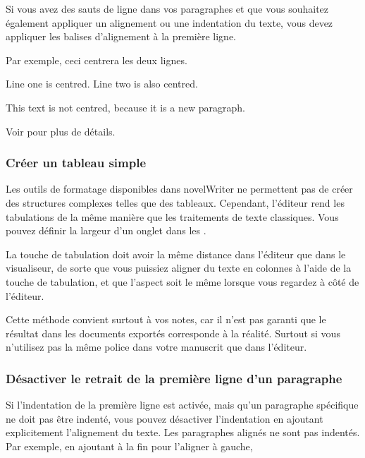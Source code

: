 \documentclass[a4paper,11pt,french]{sphinxmanual}
\begin{document}
\sphinxAtStartPar
Si vous avez des sauts de ligne dans vos paragraphes et que vous souhaitez également appliquer un alignement ou une indentation du texte, vous devez appliquer les balises d’alignement à la première ligne.

\sphinxAtStartPar
Par exemple, ceci centrera les deux lignes.

\begin{sphinxVerbatim}[commandchars=\\\{\}]
\PYGZgt{}\PYGZgt{} Line one is centred. \PYGZlt{}\PYGZlt{}
Line two is also centred.

This text is not centred, because it is a new paragraph.
\end{sphinxVerbatim}

\sphinxAtStartPar
Voir {\hyperref[\detokenize{usage_format:a-fmt-align}]{}} pour plus de détails.
\subsubsection*{Créer un tableau simple}

\sphinxAtStartPar
Les outils de formatage disponibles dans novelWriter ne permettent pas de créer des structures complexes telles que des tableaux. Cependant, l’éditeur rend les tabulations de la même manière que les traitements de texte classiques. Vous pouvez définir la largeur d’un onglet dans les .

\sphinxAtStartPar
La touche de tabulation doit avoir la même distance dans l’éditeur que dans le visualiseur, de sorte que vous puissiez aligner du texte en colonnes à l’aide de la touche de tabulation, et que l’aspect soit le même lorsque vous regardez à côté de l’éditeur.

\sphinxAtStartPar
Cette méthode convient surtout à vos notes, car il n’est pas garanti que le résultat dans les documents exportés corresponde à la réalité. Surtout si vous n’utilisez pas la même police dans votre manuscrit que dans l’éditeur.
\subsubsection*{Désactiver le retrait de la première ligne d’un paragraphe}

\sphinxAtStartPar
Si l’indentation de la première ligne est activée, mais qu’un paragraphe spécifique ne doit pas être indenté, vous pouvez désactiver l’indentation en ajoutant explicitement l’alignement du texte. Les paragraphes alignés ne sont pas indentés. Par exemple, en ajoutant \sphinxcode{\sphinxupquote{\textless{}\textless{}}} à la fin pour l’aligner à gauche,
\end{document}
